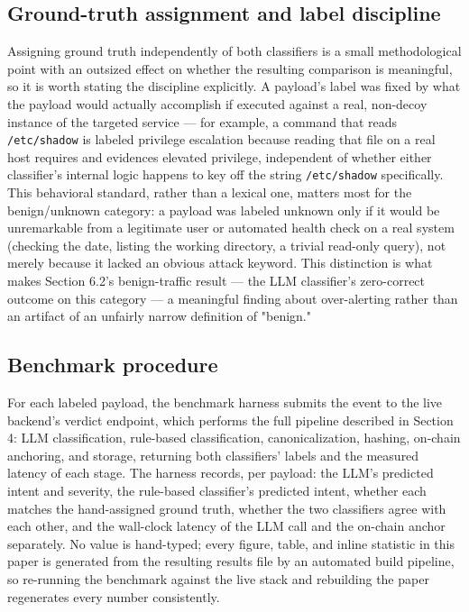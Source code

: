 \documentclass[journal,10pt,twocolumn]{IEEEtran}
\begin{document}
\subsection{Ground-truth assignment and label discipline}

Assigning ground truth independently of both classifiers is a small methodological point with an outsized effect on whether the resulting comparison is meaningful, so it is worth stating the discipline explicitly. A payload's label was fixed by what the payload would actually accomplish if executed against a real, non-decoy instance of the targeted service --- for example, a command that reads \texttt{/etc/shadow} is labeled privilege escalation because reading that file on a real host requires and evidences elevated privilege, independent of whether either classifier's internal logic happens to key off the string \texttt{/etc/shadow} specifically. This behavioral standard, rather than a lexical one, matters most for the benign/unknown category: a payload was labeled unknown only if it would be unremarkable from a legitimate user or automated health check on a real system (checking the date, listing the working directory, a trivial read-only query), not merely because it lacked an obvious attack keyword. This distinction is what makes Section 6.2's benign-traffic result --- the LLM classifier's zero-correct outcome on this category --- a meaningful finding about over-alerting rather than an artifact of an unfairly narrow definition of "benign."

\subsection{Benchmark procedure}

For each labeled payload, the benchmark harness submits the event to the live backend's verdict endpoint, which performs the full pipeline described in Section 4: LLM classification, rule-based classification, canonicalization, hashing, on-chain anchoring, and storage, returning both classifiers' labels and the measured latency of each stage. The harness records, per payload: the LLM's predicted intent and severity, the rule-based classifier's predicted intent, whether each matches the hand-assigned ground truth, whether the two classifiers agree with each other, and the wall-clock latency of the LLM call and the on-chain anchor separately. No value is hand-typed; every figure, table, and inline statistic in this paper is generated from the resulting results file by an automated build pipeline, so re-running the benchmark against the live stack and rebuilding the paper regenerates every number consistently.
\end{document}
